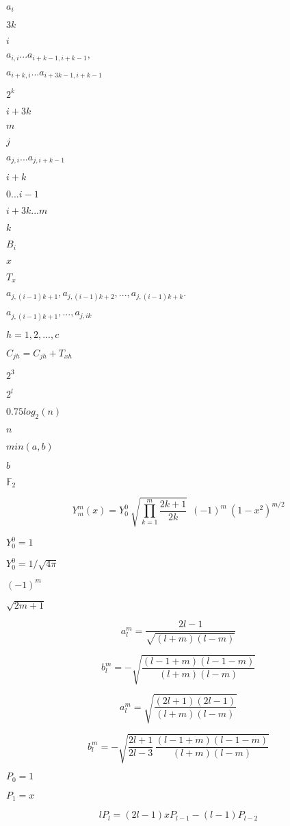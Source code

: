 \documentclass{article}
\begin{document}
$a_i$
\pagebreak

$3k$
\pagebreak

$i$
\pagebreak

$a_{i,i} ... a_{i+k-1,i+k-1},$
\pagebreak

$a_{i+k,i} ... a_{i+3k-1,i+k-1}$
\pagebreak

$2^k$
\pagebreak

$i + 3k$
\pagebreak

$m$
\pagebreak

$j$
\pagebreak

$a_{j,i} ... a_{j,i+k-1}$
\pagebreak

$ i + k$
\pagebreak

$0 ... i-1$
\pagebreak

$i + 3k ... m$
\pagebreak

$k$
\pagebreak

$B_i$
\pagebreak

$x$
\pagebreak

$T_x$
\pagebreak

$a_{j,(i-1)k+1}, a_{j,(i-1)k+2} , ... , a_{j,(i-1)k+k}.$
\pagebreak

$a_{j,(i-1)k+1}, ... , a_{j,ik}$
\pagebreak

$h = 1,2, ... , c$
\pagebreak

$C_{jh} = C_{jh} + T_{xh}$
\pagebreak

$2^3$
\pagebreak

$2^l$
\pagebreak

$0.75 log_2(n)$
\pagebreak

$n$
\pagebreak

$min(a,b)$
\pagebreak

$b$
\pagebreak

$\mathbb{F}_2$
\pagebreak

\[ Y_m^m(x) = Y_0^0 \ \sqrt{ \prod_{k=1}^{m} \frac{2k+1}{2k} } \ \ (-1)^m \ (1-x^2)^{m/2} \]
\pagebreak

$ Y_0^0 = 1 $
\pagebreak

$ Y_0^0 = 1/\sqrt{4\pi} $
\pagebreak

$ (-1)^m $
\pagebreak

$ \sqrt{2m+1} $
\pagebreak

\[ a_l^m = \frac{2l-1}{\sqrt{(l+m)(l-m)}} \]
\pagebreak

\[ b_l^m = -\sqrt{\frac{(l-1+m)(l-1-m)}{(l+m)(l-m)}} \]
\pagebreak

\[ a_l^m = \sqrt{\frac{(2l+1)(2l-1)}{(l+m)(l-m)}} \]
\pagebreak

\[ b_l^m = -\sqrt{\frac{2l+1}{2l-3}\,\frac{(l-1+m)(l-1-m)}{(l+m)(l-m)}} \]
\pagebreak

$ P_0 = 1 $
\pagebreak

$ P_1 = x $
\pagebreak

\[ l P_l = (2l-1) x P_{l-1} - (l-1) P_{l-2} \]
\pagebreak
\end{document}
